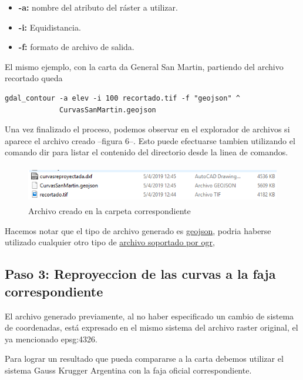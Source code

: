 \documentclass[12pt,]{extarticle}
\begin{document}
\begin{itemize}
\item
  \textbf{-a:} nombre del atributo del ráster a utilizar.
\item
  \textbf{-i:} Equidistancia.
\item
  \textbf{-f:} formato de archivo de salida.
\end{itemize}

El mismo ejemplo, con la carta da General San Martin, partiendo del
archivo recortado queda

\begin{verbatim}
gdal_contour -a elev -i 100 recortado.tif -f "geojson" ^
             CurvasSanMartin.geojson
\end{verbatim}

Una vez finalizado el proceso, podemos observar en el explorador de
archivos si aparece el archivo creado --figura 6--. Esto puede
efectuarse tambien utilizando el comando dir para listar el contenido
del directorio desde la linea de comandos.

\begin{figure}
\centering
\includegraphics[width=5.91667in,height=0.64236in]{../img/image11.png}
\caption{Archivo creado en la carpeta correspondiente}
\end{figure}

Hacemos notar que el tipo de archivo generado es
\href{http://geojson.org/}{geojson}, podria haberse utilizado cualquier
otro tipo de \href{https://www.gdal.org/ogr_formats.html}{archivo
soportado por ogr},

\hypertarget{paso-3-reproyeccion-de-las-curvas-a-la-faja-correspondiente}{%
\subsection{Paso 3: Reproyeccion de las curvas a la faja
correspondiente}\label{paso-3-reproyeccion-de-las-curvas-a-la-faja-correspondiente}}

El archivo generado previamente, al no haber especificado un cambio de
sistema de coordenadas, está expresado en el mismo sistema del archivo
raster original, el ya mencionado epsg:4326.

Para lograr un resultado que pueda compararse a la carta debemos
utilizar el sistema Gauss Krugger Argentina con la faja oficial
correspondiente.
\end{document}
